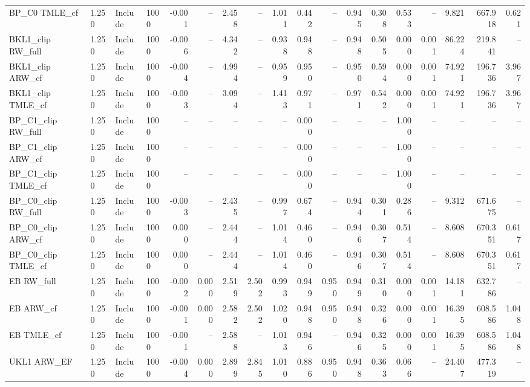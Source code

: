 \begin{tabular}{llllrrrrrrrrrrrrrr}
BP\_C0 TMLE\_cf & 1.250 & Include & 1000 & -0.001 & -- & 2.458 & -- & 1.011 & 0.442 & -- & 0.945 & 0.308 & 0.533 & -- & 9.821 & 667.918 & 0.621 \\
BKL1\_clip RW\_full & 1.250 & Include & 1000 & -0.006 & -- & 4.342 & -- & 0.938 & 0.948 & -- & 0.948 & 0.505 & 0.000 & 0.001 & 86.224 & 219.841 & -- \\
BKL1\_clip ARW\_cf & 1.250 & Include & 1000 & -0.004 & -- & 4.994 & -- & 0.959 & 0.950 & -- & 0.950 & 0.594 & 0.000 & 0.001 & 74.921 & 196.736 & 3.967 \\
BKL1\_clip TMLE\_cf & 1.250 & Include & 1000 & -0.003 & -- & 3.094 & -- & 1.413 & 0.971 & -- & 0.971 & 0.542 & 0.000 & 0.001 & 74.921 & 196.736 & 3.967 \\
BP\_C1\_clip RW\_full & 1.250 & Include & 1000 & -- & -- & -- & -- & -- & 0.000 & -- & -- & -- & 1.000 & -- & -- & -- & -- \\
BP\_C1\_clip ARW\_cf & 1.250 & Include & 1000 & -- & -- & -- & -- & -- & 0.000 & -- & -- & -- & 1.000 & -- & -- & -- & -- \\
BP\_C1\_clip TMLE\_cf & 1.250 & Include & 1000 & -- & -- & -- & -- & -- & 0.000 & -- & -- & -- & 1.000 & -- & -- & -- & -- \\
BP\_C0\_clip RW\_full & 1.250 & Include & 1000 & -0.003 & -- & 2.435 & -- & 0.997 & 0.674 & -- & 0.944 & 0.301 & 0.286 & -- & 9.312 & 671.675 & -- \\
BP\_C0\_clip ARW\_cf & 1.250 & Include & 1000 & 0.000 & -- & 2.444 & -- & 1.014 & 0.460 & -- & 0.946 & 0.307 & 0.514 & -- & 8.608 & 670.351 & 0.617 \\
BP\_C0\_clip TMLE\_cf & 1.250 & Include & 1000 & 0.000 & -- & 2.444 & -- & 1.014 & 0.460 & -- & 0.946 & 0.307 & 0.514 & -- & 8.608 & 670.351 & 0.617 \\
EB RW\_full & 1.250 & Include & 1000 & -0.002 & 0.000 & 2.519 & 2.502 & 0.993 & 0.949 & 0.950 & 0.949 & 0.310 & 0.000 & 0.001 & 14.181 & 632.786 & -- \\
EB ARW\_cf & 1.250 & Include & 1000 & -0.001 & 0.000 & 2.582 & 2.502 & 1.020 & 0.948 & 0.950 & 0.948 & 0.326 & 0.000 & 0.001 & 16.395 & 608.586 & 1.048 \\
EB TMLE\_cf & 1.250 & Include & 1000 & -0.001 & -- & 2.588 & -- & 1.013 & 0.946 & -- & 0.946 & 0.325 & 0.000 & 0.001 & 16.395 & 608.586 & 1.048 \\
UKL1 ARW\_EF & 1.250 & Include & 1000 & -0.004 & 0.000 & 2.899 & 2.845 & 1.010 & 0.886 & 0.950 & 0.948 & 0.363 & 0.066 & -- & 24.407 & 477.319 & -- \\

\end{tabular}

